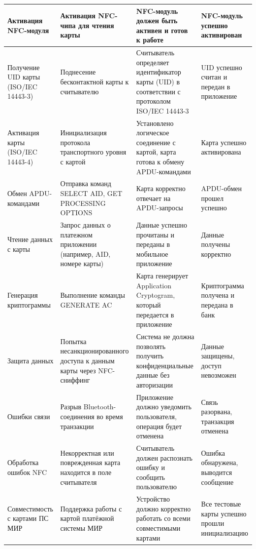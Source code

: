 \begin{longtable}[l]{| P{0.18\textwidth} | P{0.2\textwidth} | P{0.26\textwidth} | P{0.26\textwidth}|}
    Активация NFC-модуля &
    Активация NFC-чипа для чтения карты &
    NFC-модуль должен быть активен и готов к работе &
    NFC-модуль успешно активирован \\
    \hline

    Получение UID карты (ISO/IEC 14443-3) &
    Поднесение бесконтактной карты к считывателю &
    Считыватель определяет идентификатор карты (UID) в соответствии с протоколом ISO/IEC 14443-3 &
    UID успешно считан и передан в приложение \\
    \hline

    Активация карты (ISO/IEC 14443-4) &
    Инициализация протокола транспортного уровня с картой &
    Установлено логическое соединение с картой, карта готова к обмену APDU-командами &
    Карта успешно активирована \\
    \hline

    Обмен APDU-командами &
    Отправка команд SELECT AID, GET PROCESSING OPTIONS &
    Карта корректно отвечает на APDU-запросы &
    APDU-обмен прошел успешно \\
    \hline

    Чтение данных с карты &
    Запрос данных о платежном приложении (например, AID, номере карты) &
    Данные успешно прочитаны и переданы в мобильное приложение &
    Данные получены корректно \\
    \hline

    Генерация криптограммы &
    Выполнение команды GENERATE AC &
    Карта генерирует Application Cryptogram, который передается в приложение &
    Криптограмма получена и передана в банк \\
    \hline

    Защита данных &
    Попытка несанкционированного доступа к данным карты через NFC-сниффинг &
    Система не должна позволять получить конфиденциальные данные без авторизации &
    Данные защищены, доступ невозможен \\
    \hline

    Ошибки связи &
    Разрыв Bluetooth-соединения во время транзакции &
    Приложение должно уведомить пользователя, операция будет отменена &
    Связь разорвана, транзакция отменена \\
    \hline

    Обработка ошибок NFC &
    Некорректная или поврежденная карта находится в поле считывателя &
    Считыватель должен распознать ошибку и сообщить пользователю &
    Ошибка обнаружена, выводится сообщение \\
    \hline

    Совместимость с картами ПС МИР &
    Поддержка работы с картой платёжной системы МИР &
    Устройство должно корректно работать со всеми совместимыми картами &
    Все тестовые карты успешно прошли инициализацию \\
    \hline

\end{longtable}

